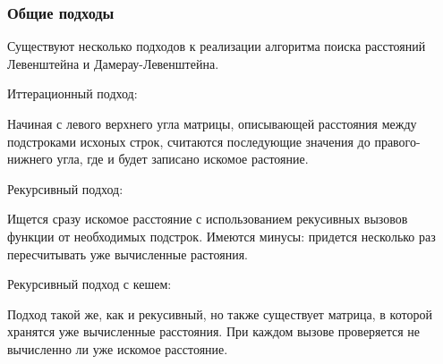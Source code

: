 \subsubsection{Общие подходы}
Существуют несколько подходов к реализации алгоритма поиска расстояний Левенштейна и Дамерау-Левенштейна.\par
Иттерационный подход:\par
Начиная с левого верхнего угла матрицы, описывающей расстояния между подстроками исхоных строк, 
считаются последующие значения до правого-нижнего угла, где и будет записано искомое растояние.\par
\pagebreak
Рекурсивный подход:\par
Ищется сразу искомое расстояние с использованием рекусивных вызовов функции от необходимых подстрок.
Имеются минусы: придется несколько раз пересчитывать уже вычисленные растояния.\par
Рекурсивный подход с кешем:\par
Подход такой же, как и рекусивный, но также существует матрица, в которой хранятся уже вычисленные расстояния.
При каждом вызове проверяется не вычисленно ли уже искомое расстояние.




\pagebreak